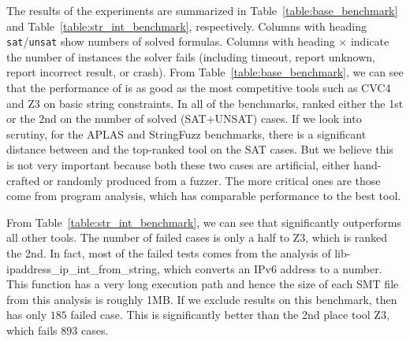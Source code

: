 The results of the experiments are summarized in Table~\ref{table:base_benchmark} and Table~\ref{table:str_int_benchmark}, respectively. Columns with heading \texttt{sat}/\texttt{unsat} show numbers of solved formulas. Columns with heading $\times$ indicate the number of instances the solver fails (including timeout, report unknown, report incorrect result, or crash). 
From Table~\ref{table:base_benchmark}, we can see that the performance  of {\tool} is as good as the most competitive tools such as CVC4 and Z3 on basic string constraints. In all of the benchmarks, {\tool} ranked either the 1st or the 2nd on the number of solved (SAT+UNSAT) cases. If we look into scrutiny, for the APLAS and StringFuzz benchmarks, there is a significant distance between {\tool} and the top-ranked tool on the SAT cases. But we believe this is not very important because both these two cases are artificial, either hand-crafted or randomly produced from a fuzzer. The more critical ones are those come from program analysis, which {\tool} has comparable performance to the best tool.

From Table~\ref{table:str_int_benchmark}, we can see that {\tool} significantly outperforms all other tools. The number of failed cases is only a half to Z3, which is ranked the 2nd. In fact, most of the failed tests comes from the analysis of {lib-ipaddress\_ip\_int\_from\_string}, which converts an IPv6 address to a number. This function has a very long execution path and hence the size of each SMT file from this analysis is roughly 1MB. If we exclude results on this benchmark, then {\tool} has only $185$ failed case. This is significantly better than the 2nd place tool Z3, which fails $893$ cases.



